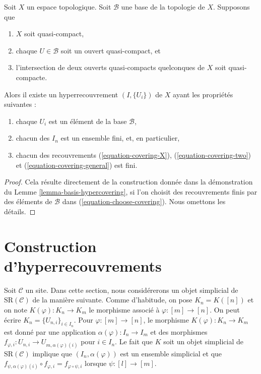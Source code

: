\begin{lemma}
\label{lemma-quasi-separated-quasi-compact-hypercovering}
Soit $X$ un espace topologique.
Soit $\mathcal{B}$ une base de la topologie de $X$.
Supposons que
\begin{enumerate}
\item $X$ soit quasi-compact,
\item chaque $U \in \mathcal{B}$ soit un ouvert quasi-compact, et
\item l'intersection de deux ouverts quasi-compacts quelconques de
$X$ soit quasi-compacte.
\end{enumerate}
Alors il existe un hyperrecouvrement $(I, \{U_i\})$ de $X$ ayant les
propriétés suivantes :
\begin{enumerate}
\item chaque $U_i$ est un élément de la base $\mathcal{B}$,
\item chacun des $I_n$ est un ensemble fini, et, en particulier,
\item chacun des recouvrements (\ref{equation-covering-X}),
(\ref{equation-covering-two}) et (\ref{equation-covering-general})
est fini.
\end{enumerate}
\end{lemma}

\begin{proof}
Cela résulte directement de la construction donnée dans la démonstration du
Lemme \ref{lemma-basis-hypercovering}, si l'on choisit des recouvrements finis
par des éléments de $\mathcal{B}$ dans (\ref{equation-choose-covering}).
Nous omettons les détails.
\end{proof}







\section{Construction d'hyperrecouvrements}
\label{section-hypercovering-sites}

\noindent
Soit $\mathcal{C}$ un site. Dans cette section, nous considérerons un
objet simplicial de $\text{SR}(\mathcal{C})$ de la manière suivante.
Comme d'habitude, on pose $K_n = K([n])$ et on note $K(\varphi) : K_n \to K_m$
le morphisme associé à $\varphi : [m] \to [n]$.
On peut écrire $K_n = \{U_{n, i}\}_{i \in I_n}$. Pour
$\varphi : [m] \to [n]$, le morphisme $K(\varphi) : K_n \to K_m$
est donné par une application $\alpha(\varphi) : I_n \to I_m$ et des morphismes
$f_{\varphi, i} : U_{n, i} \to U_{m, \alpha(\varphi)(i)}$
pour $i \in I_n$. Le fait que $K$ soit un objet simplicial de
$\text{SR}(\mathcal{C})$ implique que $(I_n, \alpha(\varphi))$
est un ensemble simplicial
et que $f_{\psi, \alpha(\varphi)(i)} \circ f_{\varphi, i} =
f_{\varphi \circ \psi, i}$ lorsque $\psi : [l] \to [m]$.

